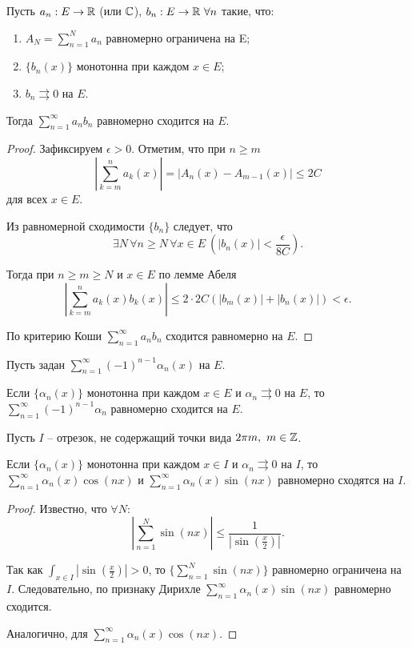 \begin{theorem}
    \label{dirichlet-func-series}
    Пусть $a_{n}: E \to \mathbb{R}$ (или $\mathbb{C}$), $b_{n}: E \to \mathbb{R} \ \forall n$ такие, что:
    \begin{enumerate}
        \item $A_{N} = \sum_{n = 1}^{N} a_{n}$ равномерно ограничена на E;
        \item $\{b_{n}(x)\}$ монотонна при каждом $x \in E$;
        \item $b_{n} \rightrightarrows 0$ на $E$.
    \end{enumerate}
    Тогда $\sum_{n = 1}^{\infty} a_{n}b_{n}$ равномерно сходится на $E$.
\end{theorem}

\begin{proof}
    Зафиксируем $\epsilon > 0$. Отметим, что при $n \ge m$
    \[\left|\sum_{k = m}^n a_k(x)\right| = |A_n(x) - A_{m - 1}(x)| \le 2C \]
    для всех $x \in E$.

    Из равномерной сходимости $\{b_n\}$ следует, что
    \[\exists N \, \forall n \ge N \, \forall x \in E \ \left(|b_n(x)| < \frac{\epsilon}{8C}\right).\]

    Тогда при $n \ge m \ge N$ и $x \in E$ по лемме Абеля
    \[\left|\sum_{k = m}^n a_k(x) b_k(x)\right| \le 2 \cdot 2C \left(|b_m(x)| + |b_n(x)|\right) < \epsilon.\]

    По критерию Коши $\sum_{n = 1}^\infty a_n b_n$ сходится равномерно на $E$.
\end{proof}

\begin{corollary}
    Пусть задан $\sum_{n = 1}^{\infty}(-1)^{n - 1} \alpha_{n}(x)$ на $E$.

    Если $\{\alpha_{n}(x)\}$ монотонна при каждом $x \in E$ и $\alpha_{n} \rightrightarrows 0$ на $E$, то $\sum_{n = 1}^{\infty} (-1)^{n - 1}\alpha_{n}$ равномерно сходится на $E$.
\end{corollary}

\begin{corollary}
    Пусть $I$ -- отрезок, не содержащий точки вида $2\pi m, \ m \in \Z$.
    
    Если $\{\alpha_{n}(x)\}$ монотонна при каждом $x \in I$ и $\alpha_{n} \rightrightarrows 0$ на $I$, то $\sum_{n = 1}^{\infty} \alpha_{n}(x)\cos(nx)$ и $\sum_{n = 1}^{\infty} \alpha_{n}(x) \sin(nx)$ равномерно сходятся на $I$.
\end{corollary}

\begin{proof}
    Известно, что $\forall N$:
    \[\left|\sum_{n = 1}^{N} \sin(nx)\right| \leq \frac{1}{|\sin(\frac{x}{2})|}.\]
    
    Так как $\int_{x \in I}|\sin(\frac{x}{2})| > 0$, то $\{\sum_{n = 1}^{N}\sin(nx)\}$ равномерно ограничена на $I$.
    Следовательно, по признаку Дирихле $\sum_{n = 1}^{\infty}\alpha_{n}(x)\sin(nx)$ равномерно сходится. 
    
    Аналогично, для $\sum_{n = 1}^{\infty} \alpha_{n}(x)\cos(nx)$.
\end{proof}

